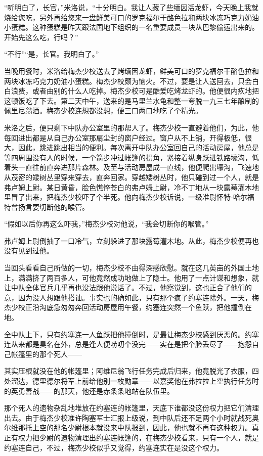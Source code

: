     “听明白了，长官，”米洛说，“十分明白。我让人藏了些缅因活龙虾，今天晚上我就烧给您吃，另外再给您来一盘鲜美可口的罗克福尔干酪色拉和两块冰冻巧克力奶油小蛋糕。这种蛋糕是昨天跟法国地下组织的一名重要成员一块从巴黎偷运出来的。开始先这么吃，行吗？”

    “不行”“是，长官。我明白了。”

    当晚用餐时，米洛给梅杰少校送去了烤缅因龙虾，鲜美可口的罗克福尔干酪色拉和两块冰冻巧克力奶油小蛋糕。梅杰少校颇为恼火。不过，要是让人送回去，只会白白浪费，或者由别的什么人吃掉。梅杰少校可是酷爱吃烤龙虾的。他便很内疚地把这顿饭吃了下去。第二天中午，送来的是马里兰水龟和整一夸脱一九三七年酿制的佩里尼翁酒。梅杰少校连想都没想，便三口两口地吃了个精光。

    米洛之后，便只剩下中队办公室里的那帮人了。梅杰少校一直避着他们，为此，他每回进出都是从自己办公室那扇尘封的窗户经过。窗户从不上销，开得极低，很大，因此，跳进跳出相当的便利。每次离开中队办公室回自己的活动房屋，他总是等四周围没有人的时候，一个箭步冲过帐篷的拐角，紧接着纵身跃进铁路壕沟，低着头一直往前直奔进那片森林。及至与活动房屋成一直线，他便爬出壕沟，飞速地从茂密的矮树丛里穿来穿去，直奔回家。穿越矮树丛时，他只碰到过一个人，就是弗卢姆上尉。某日黄昏，脸色憔悴苍白的弗卢姆上尉，冷不丁地从一块露莓灌木地里冒了出来，把梅杰少校吓了个半死。他向梅杰少校诉说，一级准尉怀特-哈尔福特曾扬言要切断他的喉管。

    “假如以后你再这么吓我，”梅杰少校对他说，“我会切断你的喉管。”

    弗卢姆上尉倒抽了一口冷气，立刻躲进了那块露莓灌木地。从此，梅杰少校便再也没有见到过他。

    当回头看看自己所做的一切，梅杰少校不由得深感欣慰。就在这几英亩的外国土地上，满满挤了两百多人，可他竟然成功地做上了隐士。他用了一点计谋和想象，就让中队全体官兵几乎再也没法跟他说话了。不过，他察觉到，这也正合了他们的意，因为没人想跟他搭讪。事实也的确如此，只有那个疯子约塞连除外。一天，梅杰少校正沿沟底急匆匆奔回活动房屋用午餐，约塞连突然一个鱼跃，把他撞倒在地。

    全中队上下，只有约塞连一人鱼跃把他撞倒时，是最让梅杰少校感到厌恶的。约塞连从来都是臭名在外，总是逢人便唠叨个没完——实在是把个脸丢尽了——抱怨自己帐篷里的那个死人——

    其实压根就没在他的帐篷里；阿维尼翁飞行任务完成后归来，他竟脱光了衣服，四处溜达，德里德尔将军上前给他别一枚勋章——以嘉奖他在弗拉拉上空执行任务时的英勇善战——的那天，他还是赤条条地站在队伍里。

    那个死人的遗物杂乱地堆放在约塞连的帐篷里，天底下谁都没这份权力把它们清理出去。由于梅杰少校准许陶塞军士汇报上级说，到中队后还不足两个小时就战死奥尔维那托上空的那名少尉根本就没来中队报到，因此，他也就不再有这种权力。真正有权力把少尉的遗物清理出约塞连帐篷的，在梅杰少校看来，只有一个人，就是约塞连自己，不过，梅杰少校似乎又觉得，约塞连实在是没这个权力。

